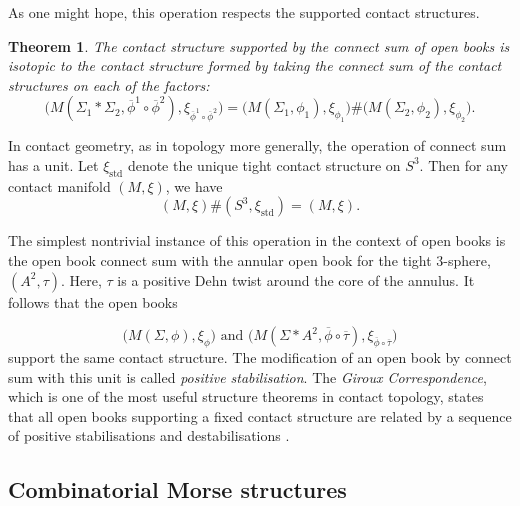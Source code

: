 \documentclass{amsart}
\newtheorem{theorem}{Theorem}[section]
\theoremstyle{definition}
\begin{document}
As one might hope, this operation respects  the supported contact structures.

\begin{theorem}\label{thm:TorisuConnectSum} \cite{Tor} The contact structure supported by the connect sum of open books is isotopic to the contact structure formed by taking the connect sum of the contact structures on each of the factors: 
\[ \big(M(\Sigma_{1} * \Sigma_2,\overline{\phi}^{1}\circ \overline{\phi}^{2}), \xi_{\overline{\phi}^{1}\circ \overline{\phi}^{2}}\big)= \big(M(\Sigma_{1},\phi_{1}), \xi_{\phi_{1}}\big)\# \big(M(\Sigma_{2},\phi_{2}), \xi_{\phi_{2}}\big).\]

\end{theorem}


In contact geometry, as in topology more generally, the operation of connect sum has a unit.  Let $\xi_{\text{std}}$ denote the unique tight contact structure on $S^3$.  Then for any contact manifold $(M, \xi)$, we have
\[ (M, \xi) \# (S^3, \xi_{\text{std}})=(M, \xi).\]

The simplest nontrivial instance of this operation in the context of open books is the open book connect sum with the annular open book for the tight $3$-sphere, $(A^2, \tau)$.  Here, $\tau$ is a positive Dehn twist around the core of the annulus.  It follows that the open books 

\[ \big(M(\Sigma,\phi), \xi_{{\phi}}\big)   \text{          and          }   \big(M(\Sigma * A^2,\overline{\phi}\circ \overline{\tau}), \xi_{\overline{\phi}\circ \overline{\tau}}\big) \]
support the same contact structure.   The modification of an open book by connect sum with this unit is called \textit{positive stabilisation}.  The  \textit{Giroux Correspondence}, which is one of the most useful structure theorems in contact topology, states that all open books supporting a fixed contact structure are related by a sequence of positive stabilisations and destabilisations \cite{Gir}. 

\subsection{Combinatorial Morse structures}
\end{document}
